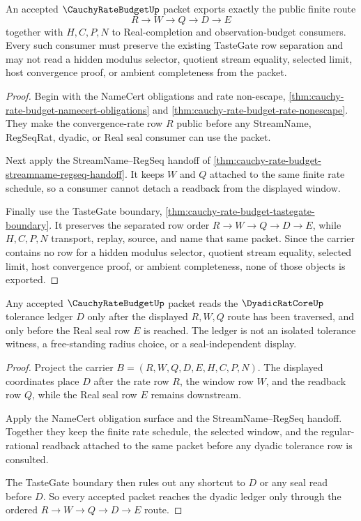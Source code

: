 \begin{theorem}
\label{thm:cauchy-rate-budget-public-export}
An accepted $\CauchyRateBudgetUp$ packet exports exactly the public finite route
$$
R \to W \to Q \to D \to E
$$
together with $H,C,P,N$ to Real-completion and observation-budget consumers. Every such consumer must preserve the existing TasteGate row separation and may not read a hidden modulus selector, quotient stream equality, selected limit, host convergence proof, or ambient completeness from the packet.
\end{theorem}
\begin{proof}
Begin with the NameCert obligations and rate non-escape, \autoref{thm:cauchy-rate-budget-namecert-obligations} and \autoref{thm:cauchy-rate-budget-rate-nonescape}. They make the convergence-rate row $R$ public before any StreamName, RegSeqRat, dyadic, or Real seal consumer can use the packet.

Next apply the StreamName--RegSeq handoff of \autoref{thm:cauchy-rate-budget-streamname-regseq-handoff}. It keeps $W$ and $Q$ attached to the same finite rate schedule, so a consumer cannot detach a readback from the displayed window.

Finally use the TasteGate boundary, \autoref{thm:cauchy-rate-budget-tastegate-boundary}. It preserves the separated row order $R \to W \to Q \to D \to E$, while $H,C,P,N$ transport, replay, source, and name that same packet. Since the carrier contains no row for a hidden modulus selector, quotient stream equality, selected limit, host convergence proof, or ambient completeness, none of those objects is exported.
\end{proof}

\begin{theorem}
\label{thm:cauchy-rate-budget-dyadic-tolerance-exactness}
Any accepted $\CauchyRateBudgetUp$ packet reads the $\DyadicRatCoreUp$ tolerance ledger $D$ only after the displayed $R,W,Q$ route has been traversed, and only before the Real seal row $E$ is reached. The ledger is not an isolated tolerance witness, a free-standing radius choice, or a seal-independent display.
\end{theorem}
\begin{proof}
Project the carrier $B=(R,W,Q,D,E,H,C,P,N)$. The displayed coordinates place $D$ after the rate row $R$, the window row $W$, and the readback row $Q$, while the Real seal row $E$ remains downstream.

Apply the NameCert obligation surface and the StreamName--RegSeq handoff. Together they keep the finite rate schedule, the selected window, and the regular-rational readback attached to the same packet before any dyadic tolerance row is consulted.

The TasteGate boundary then rules out any shortcut to $D$ or any seal read before $D$. So every accepted packet reaches the dyadic ledger only through the ordered $R \to W \to Q \to D \to E$ route.
\end{proof}

